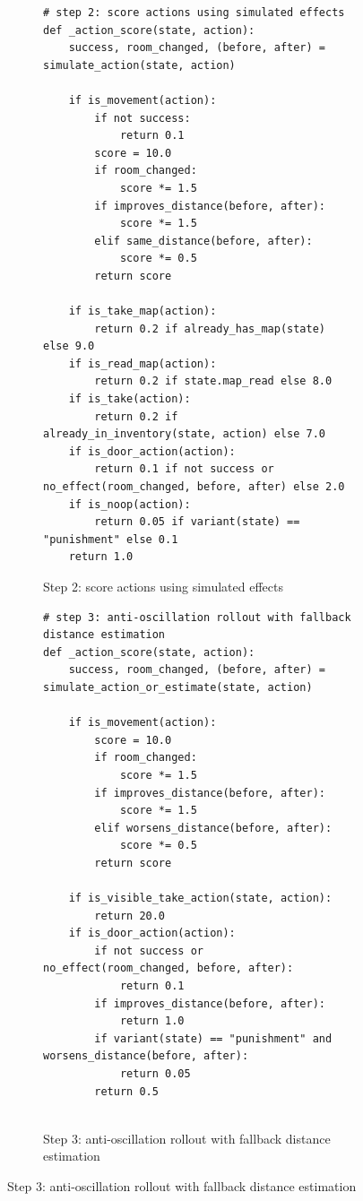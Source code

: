 \documentclass{article}
\begin{document}
\begin{figure}[p]
  \ContinuedFloat
  \centering

  \begin{subfigure}[t]{0.98\textwidth}
    \centering
    \caption{Step 2: score actions using simulated effects}
\begin{lstlisting}[basicstyle=\ttfamily\scriptsize]
# step 2: score actions using simulated effects
def _action_score(state, action):
    success, room_changed, (before, after) = simulate_action(state, action)

    if is_movement(action):
        if not success:
            return 0.1
        score = 10.0
        if room_changed:
            score *= 1.5
        if improves_distance(before, after):
            score *= 1.5
        elif same_distance(before, after):
            score *= 0.5
        return score

    if is_take_map(action):
        return 0.2 if already_has_map(state) else 9.0
    if is_read_map(action):
        return 0.2 if state.map_read else 8.0
    if is_take(action):
        return 0.2 if already_in_inventory(state, action) else 7.0
    if is_door_action(action):
        return 0.1 if not success or no_effect(room_changed, before, after) else 2.0
    if is_noop(action):
        return 0.05 if variant(state) == "punishment" else 0.1
    return 1.0
\end{lstlisting}
  \end{subfigure}

  \vspace{0.35cm}

  \begin{subfigure}[t]{0.98\textwidth}
    \centering
    \caption{Step 3: anti-oscillation rollout with fallback distance estimation}
\begin{lstlisting}[basicstyle=\ttfamily\scriptsize]
# step 3: anti-oscillation rollout with fallback distance estimation
def _action_score(state, action):
    success, room_changed, (before, after) = simulate_action_or_estimate(state, action)

    if is_movement(action):
        score = 10.0
        if room_changed:
            score *= 1.5
        if improves_distance(before, after):
            score *= 1.5
        elif worsens_distance(before, after):
            score *= 0.5
        return score

    if is_visible_take_action(state, action):
        return 20.0
    if is_door_action(action):
        if not success or no_effect(room_changed, before, after):
            return 0.1
        if improves_distance(before, after):
            return 1.0
        if variant(state) == "punishment" and worsens_distance(before, after):
            return 0.05
        return 0.5


\end{lstlisting}
\end{subfigure}
\end{figure}
\end{document}
